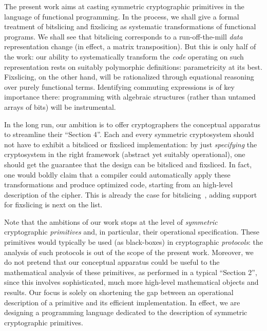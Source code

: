 \documentclass[draft,english]{jflart}
\begin{document}
The present work aims at casting symmetric cryptographic primitives in
the language of functional programming. In the process, we shall give
a formal treatment of bitslicing and fixslicing as systematic
transformations of functional programs. We shall see that bitslicing
corresponds to a run-off-the-mill \emph{data} representation change
(in effect, a matrix transposition). But this is only half of the
work: our ability to systematically transform the \emph{code}
operating on such representation rests on suitably polymorphic
definitions: parametricity at its best. Fixslicing, on the other hand,
will be rationalized through equational reasoning over purely
functional terms. Identifying commuting expressions is of key
importance there: programming with algebraic structures (rather than
untamed arrays of bits) will be instrumental.

In the long run, our ambition is to offer cryptographers the
conceptual apparatus to streamline their ``Section 4''.
Each and every symmetric cryptosystem should not have to exhibit a
bitsliced or fixsliced implementation: by just \emph{specifying} the
cryptosystem in the right framework (abstract yet suitably
operational), one should get the guarantee that the design can be
bitsliced and fixsliced. In fact, one would boldly claim that a
compiler could automatically apply these transformations and produce
optimized code, starting from an high-level description of the cipher.
This is already the case for bitslicing~\citep{mercadier:PhD}, adding support
for fixslicing is next on the list.

Note that the ambitions of our work stops at the level of
\emph{symmetric} cryptographic \emph{primitives} and, in particular,
their operational specification. These primitives would typically be
used (as black-boxes) in cryptographic \emph{protocols}: the analysis
of such protocols is out of the scope of the present work. Moreover,
we do not pretend that our conceptual apparatus could be useful to the
mathematical analysis of these primitives, as performed in a typical
``Section 2'', since this involves sophisticated, much more high-level
mathematical objects and results. Our focus is solely on shortening
the gap between an operational description of a primitive and its
efficient implementation. In effect, we are designing a programming
language dedicated to the description of symmetric cryptographic
primitives.

\end{document}
